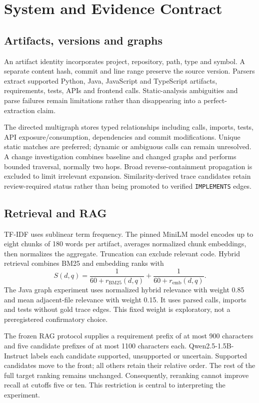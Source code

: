 \documentclass[conference,a4paper]{IEEEtran}
\begin{document}
\section{System and Evidence Contract}
\subsection{Artifacts, versions and graphs}
An artifact identity incorporates project, repository, path, type and symbol. A separate content hash, commit and line range preserve the source version. Parsers extract supported Python, Java, JavaScript and TypeScript artifacts, requirements, tests, APIs and frontend calls. Static-analysis ambiguities and parse failures remain limitations rather than disappearing into a perfect-extraction claim.

The directed multigraph stores typed relationships including calls, imports, tests, API exposure/consumption, dependencies and commit modifications. Unique static matches are preferred; dynamic or ambiguous calls can remain unresolved. A change investigation combines baseline and changed graphs and performs bounded traversal, normally two hops. Broad reverse-containment propagation is excluded to limit irrelevant expansion. Similarity-derived trace candidates retain review-required status rather than being promoted to verified \texttt{IMPLEMENTS} edges.

\subsection{Retrieval and RAG}
TF-IDF uses sublinear term frequency. The pinned MiniLM model \cite{minilm} encodes up to eight chunks of 180 words per artifact, averages normalized chunk embeddings, then normalizes the aggregate. Truncation can exclude relevant code. Hybrid retrieval combines BM25 and embedding ranks with
\begin{equation}
 S(d,q)=\frac{1}{60+r_{\mathrm{BM25}}(d,q)}+\frac{1}{60+r_{\mathrm{emb}}(d,q)}.
\end{equation}
The Java graph experiment uses normalized hybrid relevance with weight 0.85 and mean adjacent-file relevance with weight 0.15. It uses parsed calls, imports and tests without gold trace edges. This fixed weight is exploratory, not a preregistered confirmatory choice.

The frozen RAG protocol supplies a requirement prefix of at most 900 characters and five candidate prefixes of at most 1100 characters each. Qwen2.5-1.5B-Instruct \cite{qwen} labels each candidate supported, unsupported or uncertain. Supported candidates move to the front; all others retain their relative order. The rest of the full target ranking remains unchanged. Consequently, reranking cannot improve recall at cutoffs five or ten. This restriction is central to interpreting the experiment.
\end{document}

